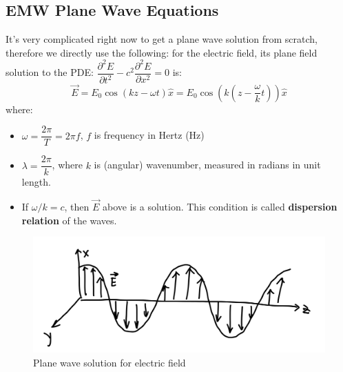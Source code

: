 \documentclass[12pt,a4paper,twoside]{article}
\numberwithin{equation}{section}
\begin{document}
\subsection{EMW Plane Wave Equations}
It's very complicated right now to get a plane wave solution from scratch, therefore we directly use the following: for the electric field, its plane field solution to the PDE: $\dfrac{\partial^2 E}{\partial t^2}-c^2\dfrac{\partial^2E}{\partial x^2}=0$ is:
\begin{equation}
    \boxed{\overrightarrow{E}=E_0\cos(kz-\omega t)\hat{x}=E_0\cos\left(k\left(z-\frac{\omega}{k} t\right)\right)\hat{x}}
    \label{Eq: e-field-wave}
\end{equation}
where:
\begin{itemize}
    \item $\omega=\dfrac{2\pi}{T}=2\pi f$, $f$ is frequency in Hertz (Hz)
    \item $\lambda = \dfrac{2\pi}{k}$, where $k$ is (angular) wavenumber, measured in radians in unit length.
    \item If $\omega/k=c$, then $\overrightarrow{E}$ above is a solution. This condition is called \textbf{dispersion relation} of the waves.
\end{itemize}
\begin{figure}[ht]
    \centering
    \includegraphics[width=12cm]{250-Revision/EMW-E.png}
    \caption{Plane wave solution for electric field}
\end{figure}
\end{document}
